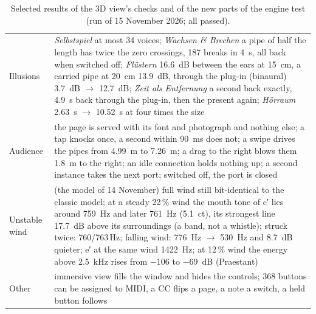 \documentclass[11pt,a4paper,parskip=half,DIV=11,toc=bibliography]{scrartcl}
\newcommand{\ui}[1]{\emph{#1}}                 %
\begin{document}
\begin{table}[!htb]
\begin{tabularx}{\linewidth}{@{}lX@{}}
Illusions & \ui{Selbstspiel} at most 34 voices; \ui{Wachsen \& Brechen} a pipe of half the length has twice the zero crossings, 187 breaks in \SI{4}{s}, all back when switched off; \ui{Flüstern} \SI{16.6}{dB} between the ears at \SI{15}{cm}, a carried pipe at \SI{20}{cm} \SI{13.9}{dB}, through the plug-in (binaural) \SI{3.7}{dB} $\rightarrow$ \SI{12.7}{dB}; \ui{Zeit als Entfernung} a second back exactly, \SI{4.9}{s} back through the plug-in, then the present again; \ui{Hörraum} \SI{2.63}{s} $\rightarrow$ \SI{10.52}{s} at four times the size \\
Audience & the page is served with its font and photograph and nothing else; a tap knocks once, a second within \SI{90}{ms} does not; a swipe drives the pipes from \SI{4.99}{m} to \SI{7.26}{m}; a drag to the right blows them \SI{1.8}{m} to the right; an idle connection holds nothing up; a second instance takes the next port; switched off, the port is closed \\
Unstable wind & (the model of 14 November) full wind still bit-identical to the classic model; at a steady 22\,\% wind the mouth tone of c′ lies around \SI{759}{Hz} and later \SI{761}{Hz} (\SI{5.1}{ct}), its strongest line \SI{17.7}{dB} above its surroundings (a band, not a whistle); struck twice: 760/763\,Hz; falling wind: \SI{776}{Hz} $\rightarrow$ \SI{530}{Hz} and \SI{8.7}{dB} quieter; e′ at the same wind \SI{1422}{Hz}; at 12\,\% wind the energy above \SI{2.5}{kHz} rises from $-106$ to \SI{-69}{dB} (Praestant) \\
Other & immersive view fills the window and hides the controls; 368 buttons can be assigned to MIDI, a CC flips a page, a note a switch, a held button follows \\
\bottomrule
\end{tabularx}
\caption{Selected results of the 3D view's checks and of the new parts of the engine test (run of 15 November 2026; all passed).}
\label{tab:tests2}
\end{table}
\end{document}
